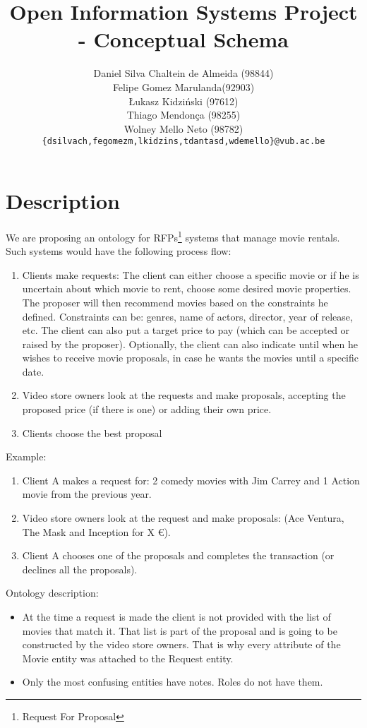 \documentclass[a4paper,10pt]{article}
\title{Open Information Systems Project - Conceptual Schema}
\author{Daniel Silva Chaltein de Almeida (98844)\\
Felipe Gomez Marulanda(92903)\\
Łukasz Kidziński (97612)\\
Thiago Mendonça (98255)\\
Wolney Mello Neto (98782)\\
\texttt{\{{}dsilvach,fegomezm,lkidzins,tdantasd,wdemello\}@vub.ac.be}}
\begin{document}
\maketitle

\section{Description}

We are proposing an ontology for RFPs\footnote{Request For Proposal} systems that manage movie rentals. Such systems would have the following process flow:
\begin{enumerate}
  \item Clients make requests: The client can either choose a specific movie or if he is uncertain about which movie to rent, choose some desired movie properties. The proposer will then recommend movies based on the constraints he defined.
    \subitem Constraints can be: genres, name of actors, director, year of release, etc.
    \subitem The client can also put a target price to pay (which can be accepted or raised by the proposer).
    \subitem Optionally, the client can also indicate until when he wishes to receive movie proposals, in case he wants the movies until a specific date.
  \item Video store owners look at the requests and make proposals, accepting the proposed price (if there is one) or adding their own price.
  \item Clients choose the best proposal
\end{enumerate}

Example:
\begin{enumerate}
  \item Client A makes a request for: 2 comedy movies with Jim Carrey and 1 Action movie from the previous year.
  \item Video store owners look at the request and make proposals: (Ace Ventura, The Mask and Inception for X \euro).
  \item Client A chooses one of the proposals and completes the transaction (or declines all the proposals).
\end{enumerate}

Ontology description:
\begin{itemize}
  \item At the time a request is made the client is not provided with the list of movies that match it. That list is part of the proposal and is going to be constructed by the video store owners. That is why every attribute of the Movie entity was attached to the Request entity.
  \item Only the most confusing entities have notes. Roles do not have them.
\end{itemize}
\end{document}
